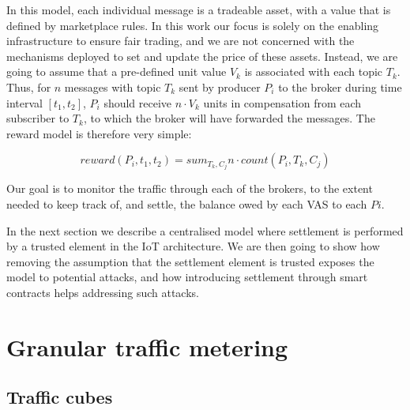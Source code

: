 \documentclass[conference]{IEEEtran}
\begin{document}
In this model, each individual message is a tradeable asset, with a value that is defined by marketplace rules. In this work our focus is solely on the enabling infrastructure to ensure fair trading, and we are not concerned with the mechanisms deployed to set and update the price of these assets. Instead, we are going to assume that a pre-defined unit value $ V_k $ is associated with each topic $ T_k $. Thus, for $ n $ messages with topic $ T_k $ sent by producer $ P_i $ to the broker during time interval $ [t_1, t_2] $, $ P_i $ should receive $ n \cdot V_k $ units in compensation from each subscriber to $ T_k $, to which the broker will have forwarded the messages. 
The reward model is therefore very simple:

\begin{equation}
 \mathit{reward}(P_i, t_1, t_2) = sum_{T_k, C_j} n \cdot \mathit{count}(P_i, T_k, C_j)   
\label{eq:reward}
 \end{equation}
 

Our goal is to monitor the traffic through each of the brokers, to the extent needed to keep track of, and settle, the balance owed by each VAS to each $ Pi $.

In the next section we describe a centralised model where settlement is performed by a trusted element in the IoT architecture.
We are then going to show how removing the assumption that the settlement element is trusted exposes the model to potential attacks, and how introducing settlement through smart contracts helps addressing such attacks.

\section{Granular traffic metering}

\subsection{Traffic cubes}
\end{document}
